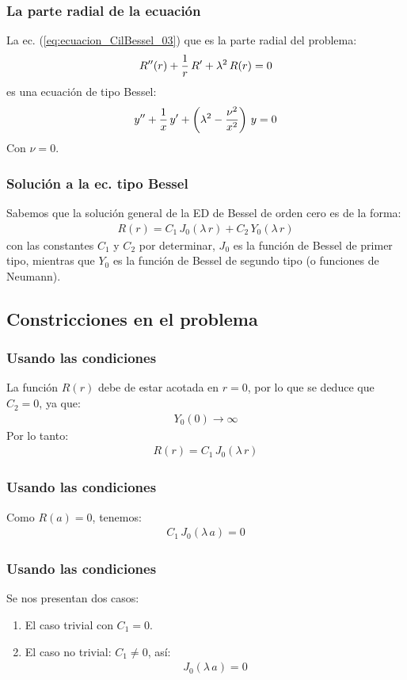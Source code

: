\documentclass[12pt]{beamer}
\begin{document}
\begin{frame}
\frametitle{La parte radial de la ecuación}
La ec. (\ref{eq:ecuacion_CilBessel_03}) que es la parte radial del problema:
\pause
\begin{align*}
{R}^{\prime \prime} (r) + \dfrac{1}{r} \, {R}^{\prime} + \lambda^{2} \, R (r) = 0
\end{align*}
\pause
es una ecuación de tipo Bessel:
\begin{align*}
{y}^{\prime \prime} + \dfrac{1}{x} \, {y}^{\prime} + \left( \lambda^{2} - \dfrac{\nu^{2}}{x^{2}} \right) \, y = 0
\end{align*}
Con $\nu = 0$.
\end{frame}
\begin{frame}
\frametitle{Solución a la ec. tipo Bessel}
Sabemos que la solución general de la ED de Bessel de orden cero es de la forma:
\pause
\begin{align*}
R (r) = C_{1} \, J_{0} (\lambda \, r) + C_{2} \, Y_{0} (\lambda \, r)
\end{align*}
con las constantes $C_{1}$ y $C_{2}$ por determinar, $J_{0}$ es la función de Bessel de primer tipo, \pause mientras que $Y_{0}$ es la función de Bessel de segundo tipo (o funciones de Neumann).
\end{frame}

\subsection{Constricciones en el problema}

\begin{frame}
\frametitle{Usando las condiciones}
La función $R (r)$ debe de estar acotada en $r = 0$,  por lo que se deduce que $C_{2} = 0$, ya que:
\pause
\begin{align*}
Y_{0} (0) \to \infty
\end{align*}
\pause
Por lo tanto:
\begin{align*}
R (r) = C_{1} \, J_{0} (\lambda \, r)
\end{align*}
\end{frame}
\begin{frame}
\frametitle{Usando las condiciones}
Como $R (a) = 0$, tenemos:
\pause
\begin{align*}
C_{1} \, J_{0} (\lambda \, a) = 0
\end{align*}
\end{frame}
\begin{frame}
\frametitle{Usando las condiciones}
Se nos presentan dos casos:
\pause
{}
\begin{enumerate}[<+->]
\item El caso trivial con $C_{1} = 0$.
\item El caso no trivial: $C_{1} \neq 0$, así:
\begin{align}
J_{0} (\lambda \, a) = 0
\label{eq:ecuacion_CilBessel_05}
\end{align}
\end{enumerate}
\end{frame}
\end{document}
